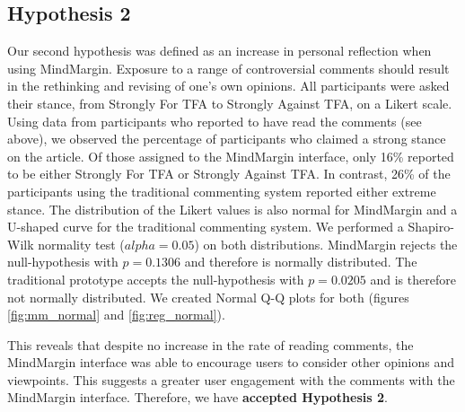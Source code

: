 \subsection{Hypothesis 2}
Our second hypothesis was defined as an increase in personal reflection when using MindMargin. Exposure to a range of controversial comments should result in the rethinking and revising of one’s own opinions. All participants were asked their stance, from Strongly For TFA to Strongly Against TFA, on a Likert scale. Using data from participants who reported to have read the comments (see above), we observed the percentage of participants who claimed a strong stance on the article. Of those assigned to the MindMargin interface, only 16\% reported to be either Strongly For TFA or Strongly Against TFA. In contrast, 26\% of the participants using the traditional commenting system reported either extreme stance. The distribution of the Likert values is also normal for MindMargin and a U-shaped curve for the traditional commenting system. We performed a Shapiro-Wilk normality test ($alpha=0.05$) on both distributions. MindMargin rejects the null-hypothesis with $p=0.1306$ and therefore is normally distributed. The traditional prototype accepts the null-hypothesis with $p=0.0205$ and is therefore not normally distributed. We created Normal Q-Q plots for both (figures \ref{fig:mm_normal} and \ref{fig:reg_normal}).

This reveals that despite no increase in the rate of reading comments, the MindMargin interface was able to encourage users to consider other opinions and viewpoints. This suggests a greater user engagement with the comments with the MindMargin interface. Therefore, we have \textbf{accepted Hypothesis 2}.

